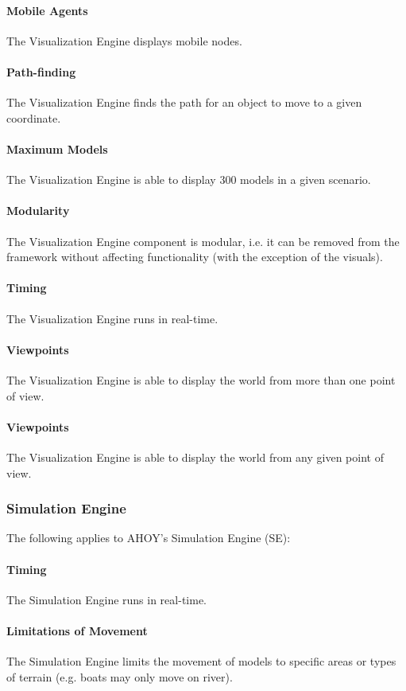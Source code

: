 \documentclass[titlepage]{article}
\begin{document}
    \paragraph{Mobile Agents} The Visualization Engine displays mobile nodes.
    \paragraph{Path-finding} The Visualization Engine finds the path for an object to move to a given coordinate.
    \paragraph{Maximum Models} The Visualization Engine is able to display 300 models in a given scenario.
    \paragraph{Modularity} The Visualization Engine component is modular, i.e. it can be removed from the framework without affecting functionality (with the exception of the visuals).
    \paragraph{Timing} The Visualization Engine runs in real-time.
    \paragraph{Viewpoints} The Visualization Engine is able to display the world from more than one point of view.
    \paragraph{Viewpoints} The Visualization Engine is able to display the world from any given point of view.

\subsubsection{Simulation Engine}
	The following applies to AHOY's Simulation Engine (SE):
    \paragraph{Timing} The Simulation Engine runs in real-time.
    \paragraph{Limitations of Movement} The Simulation Engine limits the movement of models to specific areas or types of terrain (e.g. boats may only move on river).
\end{document}
